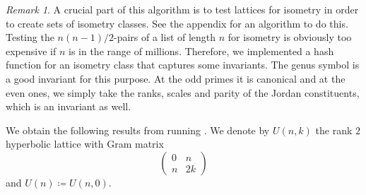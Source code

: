 \documentclass[11pt,letterpaper]{amsart}
\theoremstyle{definition}
\theoremstyle{remark}
\newtheorem{remark}[theorem]{Remark}
\begin{document}
\begin{remark}
A crucial part of this algorithm is to test lattices for isometry in order to create sets of isometry classes. See the appendix for an algorithm to do this. Testing the $n(n-1)/2$-pairs of a list of length $n$ for isometry is obviously too expensive if $n$ is in the range of millions. Therefore, we implemented a hash function for an isometry class that captures some invariants. The genus symbol \cite[Chapter 15]{conway.sloane.lattices} is a good invariant for this purpose. At the odd primes it is canonical and at the even ones, we simply take the ranks, scales and parity of the Jordan constituents, which is an invariant as well.  
\end{remark}

We obtain the following results from running . We denote by $U(n,k)$ the rank $2$ hyperbolic lattice with Gram matrix
$$\begin{pmatrix}
    0 &n\\
    n &2k
\end{pmatrix}$$
and $U(n)\coloneqq U(n,0)$.
\end{document}
